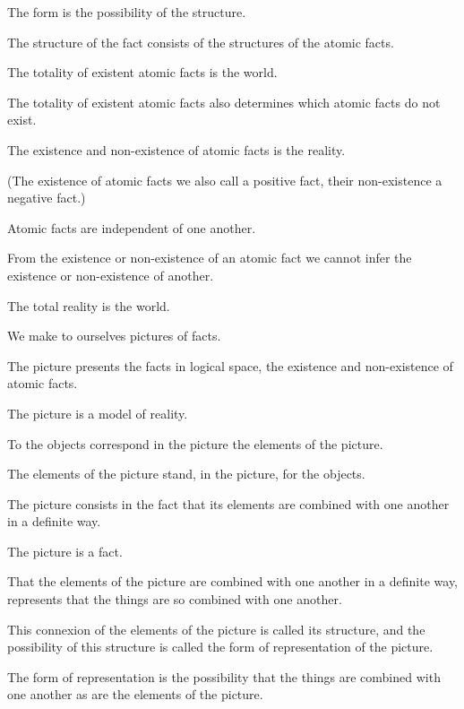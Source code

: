 {The form is the possibility of the structure.}


{The structure of the fact consists of the structures
of the atomic facts.}


{The totality of existent atomic facts is the
world.}


{The totality of existent atomic facts also determines
which atom\-ic facts do not exist.}


{The existence and non-existence of atomic facts
is the reality.

(The existence of atomic facts we also call
a positive fact, their non-existence a negative
fact.)}


{Atomic facts are independent of one another.}


{From the existence or non-existence of an
atomic fact we cannot infer the existence or non-existence
of another.}


{The total reality is the world.}


{We make to ourselves pictures of facts.}


{The picture presents the facts in logical space,
the existence and non-ex\-is\-tence of atomic
facts.}


{The picture is a model of reality.}


{To the objects correspond in the picture the
elements of the picture.}


{The elements of the picture stand, in the picture,
for the objects.}


{The picture consists in the fact that its elements
are combined with one another in a definite way.}


{The picture is a fact.}


{That the elements of the picture are combined
with one another in a definite way, represents that
\enlargethispage{9pt} %
the things are so combined with one another.

This connexion of the elements of the picture is
called its structure, and the possibility of this structure
is called the form of representation of the picture.}


{The form of representation is the possibility that
the things are combined with one another as are
the elements of the picture.}


